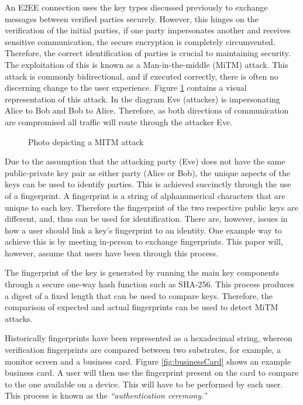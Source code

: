 An E2EE connection uses the key types discussed previously to exchange messages between verified parties securely. However, this hinges on the verification of the initial parties, if one party impersonates another and receives sensitive communication, the secure encryption is completely circumvented. Therefore, the correct identification of parties is crucial to maintaining security. The exploitation of this is known as a Man-in-the-middle (MiTM) attack. This attack is commonly bidirectional, and if executed correctly, there is often no discerning change to the user experience. Figure \ref{fig:mitm} contains a visual representation of this attack. In the diagram Eve (attacker) is impersonating Alice to Bob and Bob to Alice. Therefore, as both directions of communication are compromised all traffic will route through the attacker Eve.

\begin{center}
    
    \begin{figure}[h]
        \caption{Photo depicting a MITM attack}
        \label{fig:mitm}
    \end{figure}
\end{center}

Due to the assumption that the attacking party (Eve) does not have the same public-private key pair as either party (Alice or Bob), the unique aspects of the keys can be used to identify parties. This is achieved succinctly through the use of a fingerprint. A fingerprint is a string of alphanumerical characters that are unique to each key. Therefore the fingerprint of the two respective public keys are different, and, thus can be used for identification. There are, however, issues in how a user should link a key's fingerprint to an identity. One example way to achieve this is by meeting in-person to exchange fingerprints. This paper will, however, assume that users have been through this process.

The fingerprint of the key is generated by running the main key components through a secure one-way hash function such as SHA-256. This process produces a digest of a fixed length that can be used to compare keys. Therefore, the comparison of expected and actual fingerprints can be used to detect MiTM attacks.

Historically fingerprints have been represented as a hexadecimal string, whereon verification fingerprints are compared between two substrates, for example, a monitor screen and a business card. Figure \ref{fig:businessCard} shows an example business card. A user will then use the fingerprint present on the card to compare to the one available on a device. This will have to be performed by each user. This process is known as the \textit{``authentication ceremony.''} 

